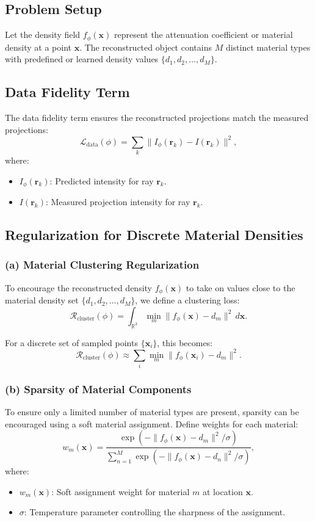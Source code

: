 \subsection{Problem Setup}
Let the density field \( f_\phi(\mathbf{x}) \) represent the attenuation coefficient or material density at a point \( \mathbf{x} \). The reconstructed object contains \( M \) distinct material types with predefined or learned density values \( \{d_1, d_2, \dots, d_M\} \).

\subsection{Data Fidelity Term}
The data fidelity term ensures the reconstructed projections match the measured projections:
\[
\mathcal{L}_{\text{data}}(\phi) = \sum_k \| I_\phi(\mathbf{r}_k) - I(\mathbf{r}_k) \|^2,
\]
where:
\begin{itemize}
	\item \( I_\phi(\mathbf{r}_k) \): Predicted intensity for ray \( \mathbf{r}_k \).
	\item \( I(\mathbf{r}_k) \): Measured projection intensity for ray \( \mathbf{r}_k \).
\end{itemize}

\subsection{Regularization for Discrete Material Densities}

\subsubsection*{(a) Material Clustering Regularization}
To encourage the reconstructed density \( f_\phi(\mathbf{x}) \) to take on values close to the material density set \( \{d_1, d_2, \dots, d_M\} \), we define a clustering loss:
\[
\mathcal{R}_{\text{cluster}}(\phi) = \int_{\mathbb{R}^3} \min_{m} \| f_\phi(\mathbf{x}) - d_m \|^2 \, d\mathbf{x}.
\]

For a discrete set of sampled points \( \{\mathbf{x}_i\} \), this becomes:
\[
\mathcal{R}_{\text{cluster}}(\phi) \approx \sum_{i} \min_{m} \| f_\phi(\mathbf{x}_i) - d_m \|^2.
\]

\subsubsection{(b) Sparsity of Material Components}
To ensure only a limited number of material types are present, sparsity can be encouraged using a soft material assignment. Define weights for each material:
\[
w_m(\mathbf{x}) = \frac{\exp(-\| f_\phi(\mathbf{x}) - d_m \|^2 / \sigma)}{\sum_{n=1}^M \exp(-\| f_\phi(\mathbf{x}) - d_n \|^2 / \sigma)},
\]
where:
\begin{itemize}
	\item \( w_m(\mathbf{x}) \): Soft assignment weight for material \( m \) at location \( \mathbf{x} \).
	\item \( \sigma \): Temperature parameter controlling the sharpness of the assignment.
\end{itemize}

